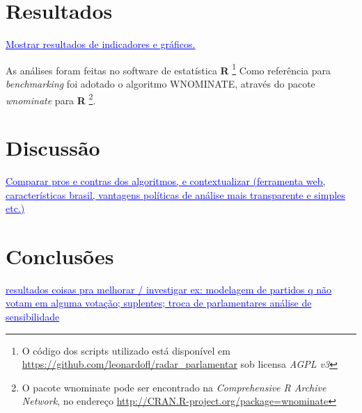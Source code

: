 \documentclass[a4paper, 12pt]{article}
\newcommand{\ins}[1]{\textcolor{blue}{\uline{#1}}} %
\begin{document}
\section{Resultados}
\label{sec:resultados}

\ins{Mostrar resultados de indicadores e gráficos.}

As análises foram feitas no software de estatística \textbf{R} \footnote{O código dos scripts utilizado está disponível em \url{https://github.com/leonardofl/radar_parlamentar} sob licensa \emph{AGPL v3}} Como referência para \emph{benchmarking} foi adotado o algoritmo WNOMINATE, através do pacote \emph{wnominate} para \textbf{R} \footnote{O pacote wnominate pode ser encontrado na \emph{Comprehensive R Archive Network}, no endereço  \url{http://CRAN.R-project.org/package=wnominate}}.


\section{Discussão}
\label{sec:discussao}

\ins{Comparar pros e contras dos algoritmos, e contextualizar (ferramenta web, características brasil, vantagens políticas de análise mais transparente e simples etc.)}

\section{Conclusões}
\label{sec:conclusoes}

\ins{resultados
 coisas pra melhorar / investigar
 ex: modelagem de partidos q não votam em alguma votação; suplentes; troca de parlamentares análise de sensibilidade }


{}

 
\end{document}
